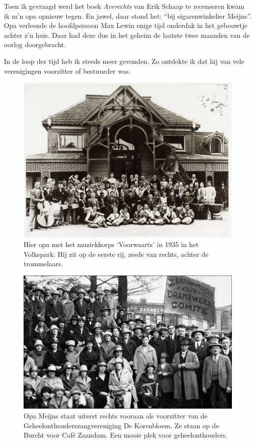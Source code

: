\documentclass[12pt,twoside, openright]{memoir}
\begin{document}
Toen ik gevraagd werd het boek \emph{Averechts} van Erik Schaap te recenseren kwam ik m’n opa opnieuw tegen. En jawel, daar stond het: ``bij sigarenwinkelier Meijns''. Opa verleende de hoofdpersoon Max Lewin enige tijd onderdak in het gebouwtje achter z’n huis. Daar had deze dus in het geheim de laatste twee maanden van de oorlog doorgebracht.

In de loop der tijd heb ik steeds meer gevonden. Zo ontdekte ik dat hij van vele verenigingen voorzitter of bestuurder was. 

\begin{figure}
\centering
\includegraphics[width=\textwidth]{img/ch2/ch2-afb05}
\caption*{\footnotesize Hier opa met het muziekkorps `Voorwaarts' in 1935 in het Volkspark. Hij zit op de eerste rij, zesde van rechts, achter de trommelaars.}
\end{figure}

\begin{figure}
\centering
\includegraphics[width=\textwidth]{img/14OpaMeijns7}
\caption*{\footnotesize Opa Meijns staat uiterst rechts vooraan als voorzitter van de Geheelonthouderszangvereniging De Korenbloem. Ze staan op de Burcht voor Café Zaandam. Een mooie plek voor geheelonthouders.}
\end{figure}
\end{document}
